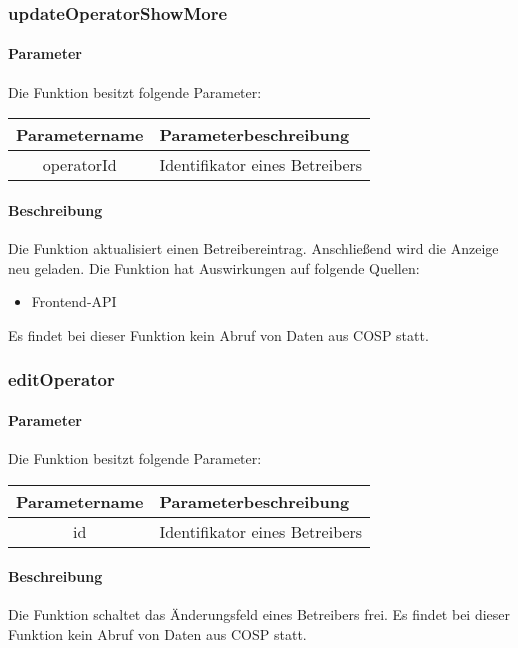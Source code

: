 \subsubsection{updateOperatorShowMore}
\paragraph{Parameter} Die Funktion besitzt folgende Parameter:
\begin{table}[H]
	\begin{tabular}{|c|p{11cm}|}
		\hline
		\textbf{Parametername} & \textbf{Parameterbeschreibung} \\ \hline
		operatorId & Identifikator eines Betreibers \\ \hline
	\end{tabular}
\end{table}
\paragraph{Beschreibung} Die Funktion aktualisiert einen Betreibereintrag. Anschließend wird die Anzeige neu geladen. Die Funktion hat Auswirkungen auf folgende Quellen:
\begin{itemize}
	\item Frontend-API
\end{itemize}
Es findet bei dieser Funktion kein Abruf von Daten aus {\glqq COSP\grqq} statt.
\subsubsection{editOperator}
\paragraph{Parameter} Die Funktion besitzt folgende Parameter:
\begin{table}[H]
	\begin{tabular}{|c|p{11cm}|}
		\hline
		\textbf{Parametername} & \textbf{Parameterbeschreibung} \\ \hline
		id & Identifikator eines Betreibers \\ \hline
	\end{tabular}
\end{table}
\paragraph{Beschreibung} Die Funktion schaltet das Änderungsfeld eines Betreibers frei. Es findet bei dieser Funktion kein Abruf von Daten aus {\glqq COSP\grqq} statt.
